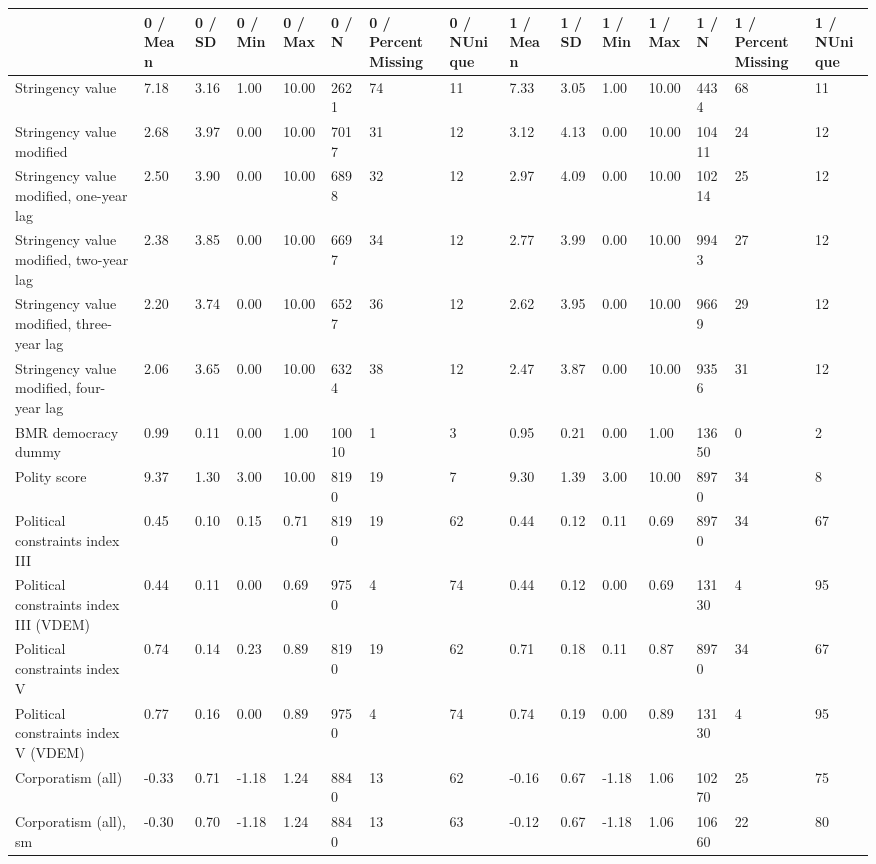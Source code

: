 
\begin{longtable}{lllllllllllllll}
\toprule
  & 0 / Mean & 0 / SD & 0 / Min & 0 / Max & 0 / N & 0 / PercentMissing & 0 / NUnique & 1 / Mean & 1 / SD & 1 / Min & 1 / Max & 1 / N & 1 / PercentMissing & 1 / NUnique\\
\midrule
Stringency value & 7.18 & 3.16 & 1.00 & 10.00 & 2621 & 74 & 11 & 7.33 & 3.05 & 1.00 & 10.00 & 4434 & 68 & 11\\
Stringency value modified & 2.68 & 3.97 & 0.00 & 10.00 & 7017 & 31 & 12 & 3.12 & 4.13 & 0.00 & 10.00 & 10411 & 24 & 12\\
Stringency value modified, one-year lag & 2.50 & 3.90 & 0.00 & 10.00 & 6898 & 32 & 12 & 2.97 & 4.09 & 0.00 & 10.00 & 10214 & 25 & 12\\
Stringency value modified, two-year lag & 2.38 & 3.85 & 0.00 & 10.00 & 6697 & 34 & 12 & 2.77 & 3.99 & 0.00 & 10.00 & 9943 & 27 & 12\\
Stringency value modified, three-year lag & 2.20 & 3.74 & 0.00 & 10.00 & 6527 & 36 & 12 & 2.62 & 3.95 & 0.00 & 10.00 & 9669 & 29 & 12\\
\addlinespace
Stringency value modified, four-year lag & 2.06 & 3.65 & 0.00 & 10.00 & 6324 & 38 & 12 & 2.47 & 3.87 & 0.00 & 10.00 & 9356 & 31 & 12\\
BMR democracy dummy & 0.99 & 0.11 & 0.00 & 1.00 & 10010 & 1 & 3 & 0.95 & 0.21 & 0.00 & 1.00 & 13650 & 0 & 2\\
Polity score & 9.37 & 1.30 & 3.00 & 10.00 & 8190 & 19 & 7 & 9.30 & 1.39 & 3.00 & 10.00 & 8970 & 34 & 8\\
Political constraints index III & 0.45 & 0.10 & 0.15 & 0.71 & 8190 & 19 & 62 & 0.44 & 0.12 & 0.11 & 0.69 & 8970 & 34 & 67\\
Political constraints index III (VDEM) & 0.44 & 0.11 & 0.00 & 0.69 & 9750 & 4 & 74 & 0.44 & 0.12 & 0.00 & 0.69 & 13130 & 4 & 95\\
\addlinespace
Political constraints index V & 0.74 & 0.14 & 0.23 & 0.89 & 8190 & 19 & 62 & 0.71 & 0.18 & 0.11 & 0.87 & 8970 & 34 & 67\\
Political constraints index V (VDEM) & 0.77 & 0.16 & 0.00 & 0.89 & 9750 & 4 & 74 & 0.74 & 0.19 & 0.00 & 0.89 & 13130 & 4 & 95\\
Corporatism (all) & -0.33 & 0.71 & -1.18 & 1.24 & 8840 & 13 & 62 & -0.16 & 0.67 & -1.18 & 1.06 & 10270 & 25 & 75\\
Corporatism (all), sm & -0.30 & 0.70 & -1.18 & 1.24 & 8840 & 13 & 63 & -0.12 & 0.67 & -1.18 & 1.06 & 10660 & 22 & 80\\

\end{longtable}
